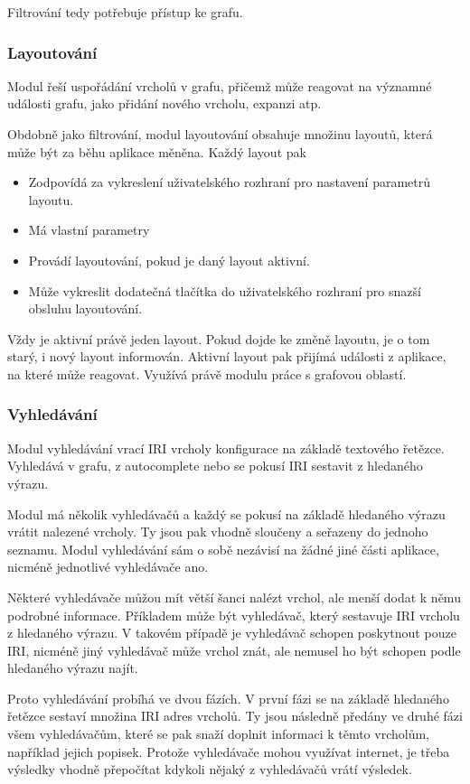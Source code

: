 Filtrování tedy potřebuje přístup ke grafu.

\subsubsection{Layoutování}
Modul řeší uspořádání vrcholů v grafu, přičemž může reagovat na významné události grafu, jako přidání nového vrcholu, expanzi atp.

Obdobně jako filtrování, modul layoutování obsahuje množinu layoutů, která může být za běhu aplikace měněna. Každý layout pak
\begin{itemize}
    \item Zodpovídá za vykreslení uživatelského rozhraní pro nastavení parametrů layoutu.
    \item Má vlastní parametry
    \item Provádí layoutování, pokud je daný layout aktivní.
    \item Může vykreslit dodatečná tlačítka do uživatelského rozhraní pro snazší obsluhu layoutování.
\end{itemize}

Vždy je aktivní právě jeden layout. Pokud dojde ke změně layoutu, je o tom starý, i nový layout informován. Aktivní layout pak přijímá události z aplikace, na které může reagovat. Využívá právě modulu práce s grafovou oblastí.

\subsubsection{Vyhledávání}
Modul vyhledávání vrací IRI vrcholy konfigurace na základě textového řetězce. Vyhledává v grafu, z autocomplete nebo se pokusí IRI sestavit z hledaného výrazu.

Modul má několik vyhledávačů a každý se pokusí na základě hledaného výrazu vrátit nalezené vrcholy. Ty jsou pak vhodně sloučeny a seřazeny do jednoho seznamu. Modul vyhledávání sám o sobě nezávisí na žádné jiné části aplikace, nicméně jednotlivé vyhledávače ano.

Některé vyhledávače můžou mít větší šanci nalézt vrchol, ale menší dodat k němu podrobné informace. Příkladem může být vyhledávač, který sestavuje IRI vrcholu z hledaného výrazu. V takovém případě je vyhledávač schopen poskytnout pouze IRI, nicméně jiný vyhledávač může vrchol znát, ale nemusel ho být schopen podle hledaného výrazu najít.

Proto vyhledávání probíhá ve dvou fázích. V první fázi se na základě hledaného řetězce sestaví množina IRI adres vrcholů. Ty jsou následně předány ve druhé fázi všem vyhledávačům, které se pak snaží doplnit informaci k těmto vrcholům, například jejich popisek. Protože vyhledávače mohou využívat internet, je třeba výsledky vhodně přepočítat kdykoli nějaký z vyhledávačů vrátí výsledek.

